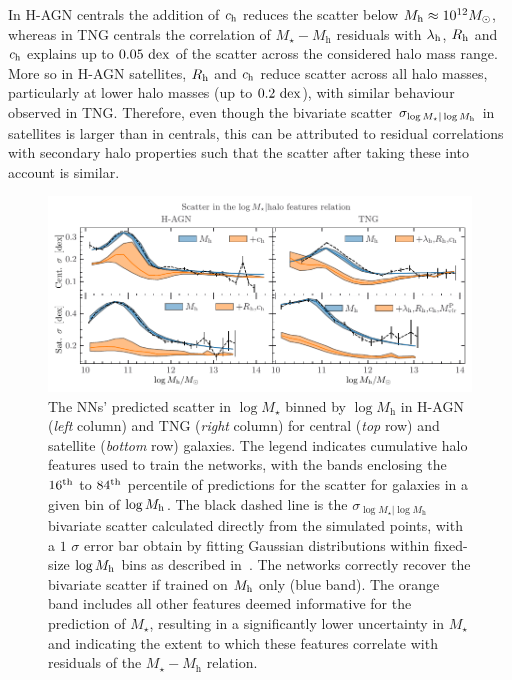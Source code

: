 \documentclass[useAMS,usenatbib]{mnras}
\begin{document}
In H-AGN centrals the addition of $c_{\rm h}$ reduces the scatter below $M_{\rm h}\approx 10^{12} M_\odot$, whereas in TNG centrals the correlation of $M_\star-M_\text{h}$ residuals with $\lambda_{\rm h}$, $R_{\rm h}$ and $c_{\rm h}$ explains up to $0.05~{\rm dex}$ of the scatter across the considered halo mass range. More so in H-AGN satellites, $R_{\rm h}$ and $c_{\rm h}$ reduce scatter across all halo masses, particularly at lower halo masses (up to $0.2~{\rm dex}$), with similar behaviour observed in TNG. Therefore, even though the bivariate scatter $\sigma_{\log M_\star | \log M_{\rm h}}$ in satellites is larger than in centrals, this can be attributed to residual correlations with secondary halo properties such that the scatter after taking these into account is similar.

\begin{figure}
    \centering
    \includegraphics[width=\textwidth]{Figures/NN_scatter_mstar_HAGN.pdf}
    \caption{The \acp{NN}' predicted scatter in $\log M_\star$ binned by $\log M_\mathrm{h}$ in H-AGN (\emph{left} column) and TNG (\emph{right} column) for central (\emph{top} row) and satellite (\emph{bottom} row) galaxies. The legend indicates cumulative halo features used to train the networks, with the bands enclosing the $16^{\rm th}$ to $84^{\rm th}$ percentile of predictions for the scatter for galaxies in a given bin of $\log M_{\rm h}$. The black dashed line is the $\sigma_{\log M_\star | \log M_\mathrm{h}}$ bivariate scatter calculated directly from the simulated points, with a $1$ $\sigma$ error bar obtain by fitting Gaussian distributions within fixed-size $\log M_{\rm h}$ bins as described in~. The networks correctly recover the bivariate scatter if trained on $M_{\rm h}$ only (blue band). The orange band includes all other features deemed informative for the prediction of $M_\star$, resulting in a significantly lower uncertainty in $M_\star$ and indicating the extent to which these features correlate with residuals of the $M_\star-M_\mathrm{h}$ relation.
    }
    \label{fig:NNscatter_Mstar}
\end{figure}
\end{document}
